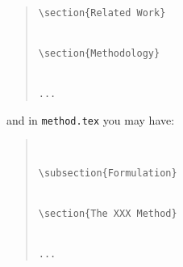\begin{enumerate}
\begin{quote}
\begin{scriptsize}
\begin{verbatim}
\section{Related Work}


\section{Methodology}


...
    \end{verbatim}\end{scriptsize}\end{quote}
    and in \texttt{method.tex} you may have:
    \begin{quote}\begin{scriptsize}\begin{verbatim}


\subsection{Formulation}


\section{The XXX Method}


...
    \end{verbatim}\end{scriptsize}\end{quote}

\end{enumerate}
